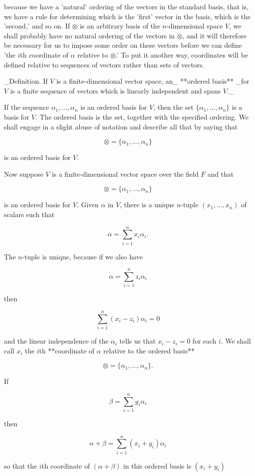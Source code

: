 because we have a 'natural' ordering of the vectors in the standard basis, that is, we have a rule for determining which is the 'first' vector in the basis, which is the 'second,' and so on. If \(\otimes\) is an arbitrary basis of the \(n\)-dimensional space \(V\), we shall probably have no natural ordering of the vectors in \(\otimes\), and it will therefore be necessary for us to impose some order on these vectors before we can define 'the \(i\)th coordinate of \(\alpha\) relative to \(\otimes\).' To put it another way, coordinates will be defined relative to sequences of vectors rather than sets of vectors.

_Definition. If \(V\) is a finite-dimensional vector space, an_ **ordered basis** _for \(V\) is a finite sequence of vectors which is linearly independent and spans \(V\)._

If the sequence \(\alpha_{1},\ldots,\alpha_{n}\) is an ordered basis for \(V\), then the set \(\{\alpha_{1},\ldots,\alpha_{n}\}\) is a basis for \(V\). The ordered basis is the set, together with the specified ordering. We shall engage in a slight abuse of notation and describe all that by saying that

\[\otimes=\{\alpha_{1},\ldots,\alpha_{n}\}\]

is an ordered basis for \(V\).

Now suppose \(V\) is a finite-dimensional vector space over the field \(F\) and that

\[\otimes=\{\alpha_{1},\ldots,\alpha_{n}\}\]

is an ordered basis for \(V\). Given \(\alpha\) in \(V\), there is a unique \(n\)-tuple \((x_{1},\ldots,x_{n})\) of scalars such that

\[\alpha=\sum_{i=1}^{n}x_{i}\alpha_{i}.\]

The \(n\)-tuple is unique, because if we also have

\[\alpha=\sum_{i=1}^{n}z_{i}\alpha_{i}\]

then

\[\sum_{i=1}^{n}(x_{i}-z_{i})\alpha_{i}=0\]

and the linear independence of the \(\alpha_{i}\) tells us that \(x_{i}-z_{i}=0\) for each \(i\). We shall call \(x_{i}\) the \(i\)th **coordinate of \(\alpha\) relative to the ordered basis**

\[\otimes=\{\alpha_{1},\ldots,\alpha_{n}\}.\]

If

\[\beta=\sum_{i=1}^{n}y_{i}\alpha_{i}\]

then

\[\alpha+\beta=\sum_{i=1}^{n}(x_{i}+y_{i})\alpha_{i}\]

so that the \(i\)th coordinate of \((\alpha+\beta)\) in this ordered basis is \((x_{i}+y_{i})\) 